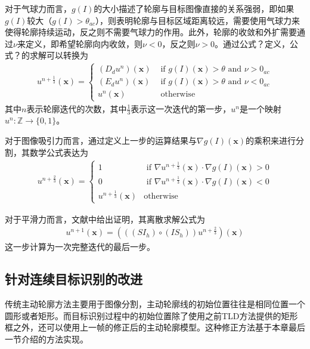 对于气球力而言，$g(I)$的大小描述了轮廓与目标图像直接的关系强弱，即如果$g(I)$较大（$g(I)>\theta_{ac}$），则表明轮廓与目标区域距离较远，需要使用气球力来使得轮廓持续运动，反之则不需要气球力的作用。此外，轮廓的收敛和外扩需要通过$\nu$来定义，即希望轮廓向内收敛，则$\nu<0$，反之则$\nu>0$。通过公式？定义，公式？的求解可以转换为
\begin{align}
u^{n+\frac{1}{3}}(\mathbf{x})=\left\{ \begin{array}{ll}
(D_du^n)(\mathbf{x}) &\mbox{ if $g(I)(\mathbf{x})>\theta$ and $\nu>0_{ac}$} \\
(E_du^n)(\mathbf{x}) &\mbox{ if $g(I)(\mathbf{x})>\theta$ and $\nu<0_{ac}$} \\
u^{n}(\mathbf{x}) &\mbox{ otherwise}
\end{array} \right.
\end{align}
其中$n$表示轮廓迭代的次数，其中$\frac{1}{3}$表示这一次迭代的第一步，$u^n$是一个映射$u^n:\mathbb{Z} \rightarrow \{0, 1\}$。

对于图像吸引力而言，通过定义上一步的运算结果与$ \nabla g(I)(\mathbf{x}) $的乘积来进行分割，其数学公式表达为
\begin{align}
u^{n+\frac{2}{3}}(\mathbf{x})=\left\{ \begin{array}{ll}
1 &\mbox{ if $\nabla u^{n+\frac{1}{3}}(\mathbf{x}) \cdot \nabla g(I)(\mathbf{x}) > 0$} \\
0&\mbox{ if $\nabla u^{n+\frac{1}{3}}(\mathbf{x}) \cdot \nabla g(I)(\mathbf{x}) < 0$} \\
u^{n+\frac{1}{3}}(\mathbf{x}) &\mbox{otherwise}
\end{array} \right.
\end{align}

对于平滑力而言，文献中给出证明，其离散求解公式为
\begin{align}
u^{n+1} (\mathbf{x}) = (((SI_h) \circ (IS_h)) u^{n+\frac{2}{3}})(\mathbf{x})
\end{align}
这一步计算为一次完整迭代的最后一步。

\subsection{针对连续目标识别的改进}
传统主动轮廓方法主要用于图像分割，主动轮廓线的初始位置往往是相同位置一个圆形或者矩形。而目标识别过程中的初始位置除了使用之前TLD方法提供的矩形框之外，还可以使用上一帧的修正后的主动轮廓模型。这种修正方法基于本章最后一节介绍的方法实现。

